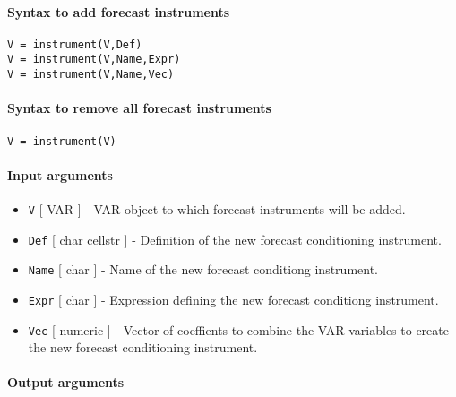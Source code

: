 


	\paragraph{Syntax to add forecast
instruments}\label{syntax-to-add-forecast-instruments}

\begin{verbatim}
V = instrument(V,Def)
V = instrument(V,Name,Expr)
V = instrument(V,Name,Vec)
\end{verbatim}

\paragraph{Syntax to remove all forecast
instruments}\label{syntax-to-remove-all-forecast-instruments}

\begin{verbatim}
V = instrument(V)
\end{verbatim}

\paragraph{Input arguments}\label{input-arguments}

\begin{itemize}
\item
  \texttt{V} {[} VAR {]} - VAR object to which forecast instruments will
  be added.
\item
  \texttt{Def} {[} char \textbar{} cellstr {]} - Definition of the new
  forecast conditioning instrument.
\item
  \texttt{Name} {[} char {]} - Name of the new forecast conditiong
  instrument.
\item
  \texttt{Expr} {[} char {]} - Expression defining the new forecast
  conditiong instrument.
\item
  \texttt{Vec} {[} numeric {]} - Vector of coeffients to combine the VAR
  variables to create the new forecast conditioning instrument.
\end{itemize}

\paragraph{Output arguments}\label{output-arguments}


